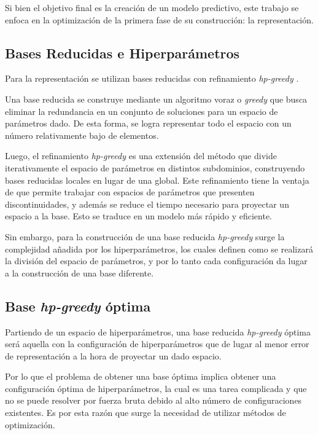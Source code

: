 Si bien el objetivo final es la creación de un modelo predictivo, este trabajo se enfoca en la optimización de la primera fase de su construcción: la representación.


\subsection*{Bases Reducidas e Hiperparámetros}

Para la representación se utilizan bases reducidas \cite{rb0book, doi:10.1137/09075250X, PhysRevLett.106.221102, 10.1115/1.1448332, rb1book} con refinamiento \textit{hp-greedy} \cite{Cerino:2022dhr}.

Una base reducida se construye mediante un algoritmo voraz o \textit{greedy} que busca eliminar la redundancia en un conjunto de soluciones para un espacio de parámetros dado. De esta forma, se logra representar todo el espacio con un número relativamente bajo de elementos. 

Luego, el refinamiento \textit{hp-greedy} es una extensión del método que divide iterativamente el espacio de parámetros en distintos subdominios, construyendo bases reducidas locales en lugar de una global. Este refinamiento tiene la ventaja de que permite trabajar con espacios de parámetros que presenten discontinuidades, y además se reduce el tiempo necesario para proyectar un espacio a la base. Esto se traduce en un modelo más rápido y eficiente.


Sin embargo, para la construcción de una base reducida \textit{hp-greedy} surge la complejidad añadida por los hiperparámetros, los cuales definen como se realizará la división del espacio de parámetros, y por lo tanto cada configuración da lugar a la construcción de una base diferente.

\subsection*{Base \textit{hp-greedy} óptima}





Partiendo de un espacio de hiperparámetros, una base reducida \textit{hp-greedy} óptima será aquella con la configuración de hiperparámetros que de lugar al menor error de representación a la hora de proyectar un dado espacio. 


Por lo que el problema de obtener una base óptima implica obtener una configuración óptima de hiperparámetros, la cual es una tarea complicada y que no se puede resolver por fuerza bruta debido al alto número de configuraciones existentes. Es por esta razón que surge la necesidad de utilizar métodos de optimización.

